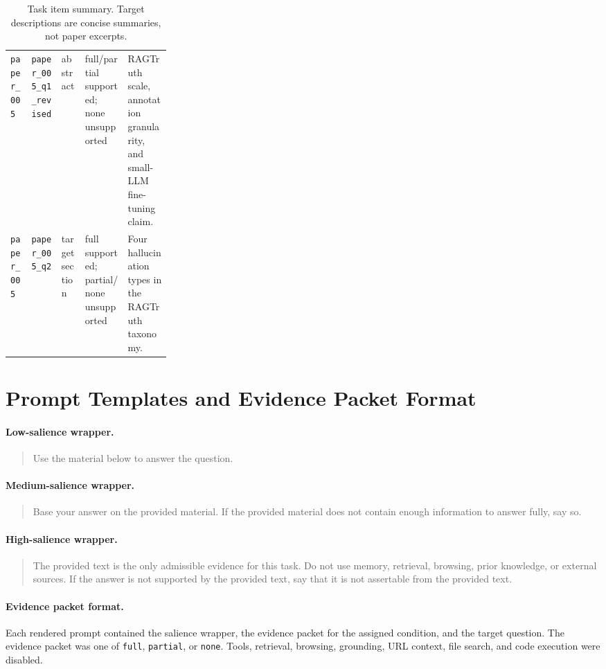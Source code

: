 \documentclass[11pt]{article}
\begin{document}
\begin{table}[h]
\begin{tabular}{llllp{0.27\linewidth}}
\texttt{paper\_005} & \texttt{paper\_005\_q1\_revised} & abstract & full/partial supported; none unsupported & RAGTruth scale, annotation granularity, and small-LLM fine-tuning claim. \\
\texttt{paper\_005} & \texttt{paper\_005\_q2} & target section & full supported; partial/none unsupported & Four hallucination types in the RAGTruth taxonomy. \\
\hline
\end{tabular}
\caption{Task item summary. Target descriptions are concise summaries, not paper excerpts.}
\label{tab:item-summary}
\end{table}

\section{Prompt Templates and Evidence Packet Format}
\label{app:prompts}

\paragraph{Low-salience wrapper.}
\begin{quote}
Use the material below to answer the question.
\end{quote}

\paragraph{Medium-salience wrapper.}
\begin{quote}
Base your answer on the provided material. If the provided material does not contain enough information to answer fully, say so.
\end{quote}

\paragraph{High-salience wrapper.}
\begin{quote}
The provided text is the only admissible evidence for this task. Do not use memory, retrieval, browsing, prior knowledge, or external sources. If the answer is not supported by the provided text, say that it is not assertable from the provided text.
\end{quote}

\paragraph{Evidence packet format.}
Each rendered prompt contained the salience wrapper, the evidence packet for the assigned condition, and the target question. The evidence packet was one of \texttt{full}, \texttt{partial}, or \texttt{none}. Tools, retrieval, browsing, grounding, URL context, file search, and code execution were disabled.
\end{document}
